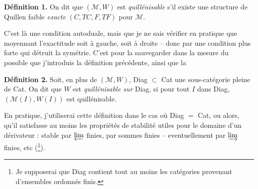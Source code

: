 \textbf{Définition 1.} On dit que $(\mathcal{M},W)$ est \textit{quillénisable} s'il existe une structure de Quillen faible \textit{exacte} $(C,TC,F,TF)$ pour $\mathcal{M}$.

C'est là une condition autoduale, mais que je ne sais vérifier en pratique que moyennant l'exactitude soit à gauche, soit à droite -- donc par une condition plus forte qui détruit la symétrie. C'est pour la sauvegarder dans la mesure du possible que j'introduis la définition précédente, ainsi que la

\textbf{Définition 2.} Soit, en plus de $(\mathcal{M},W)$, Diag $\subset$ Cat une sous-catégorie pleine de Cat. On dit que
$W$ est \textit{quillénisable sur} Diag, si pour tout $I$ dans Diag, $(\mathcal{M}(I),W(I))$ est quillénisable.

En pratique, j'utiliserai cette définition dans le cas où Diag $=$ Cat, ou alors, qu'il satisfasse au moins les propriétés de stabilité utiles pour le domaine d'un dérivateur : stable par $\varprojlim$ finies, par sommes finies -- eventuellement par $\varinjlim$ finies, etc (\footnote[29]{Je supposerai que Diag contient tout au moins les catégories provenant d'ensembles ordonnés finis.}). %

